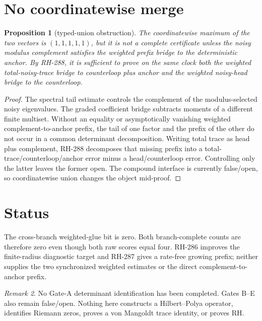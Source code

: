 \documentclass[11pt]{article}
\newtheorem{proposition}{Proposition}[section]
\theoremstyle{remark}\newtheorem{remark}[proposition]{Remark}
\begin{document}
\section{No coordinatewise merge}
\begin{proposition}[typed-union obstruction]
The coordinatewise maximum of the two vectors is $(1,1,1,1,1)$, but it is
not a complete certificate unless the noisy modulus complement satisfies the
weighted prefix bridge to the deterministic anchor.  By RH-288, it is
sufficient to prove on the same clock both the weighted total-noisy-trace
bridge to counterloop plus anchor and the weighted noisy-head bridge to the
counterloop.
\end{proposition}
\begin{proof}
The spectral tail estimate controls the complement of the modulus-selected
noisy eigenvalues.  The graded coefficient bridge subtracts moments of a
different finite multiset.  Without an equality or asymptotically vanishing
weighted complement-to-anchor prefix, the tail of one factor and the prefix
of the other do not occur in a common determinant decomposition.  Writing
total trace as head plus complement, RH-288 decomposes that missing prefix
into a total-trace/counterloop/anchor error minus a head/counterloop error.
Controlling only the latter leaves the former open.  The compound interface
is currently false/open, so coordinatewise union changes the object
mid-proof.
\end{proof}

\section{Status}
The cross-branch weighted-glue bit is zero.  Both branch-complete counts are
therefore zero even though both raw scores equal four.  RH-286 improves the
finite-radius diagnostic target and RH-287 gives a rate-free growing prefix;
neither supplies the two synchronized weighted estimates or the direct
complement-to-anchor prefix.

\begin{remark}
No Gate-A determinant identification has been completed.  Gates B--E also
remain false/open.  Nothing here constructs a Hilbert--Polya operator,
identifies Riemann zeros, proves a von Mangoldt trace identity, or proves RH.
\end{remark}
\end{document}
